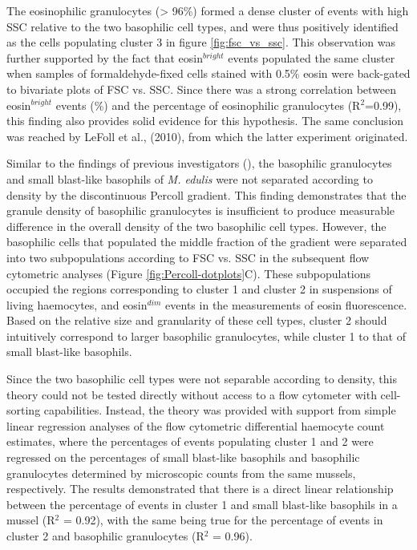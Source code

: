 The eosinophilic granulocytes (> 96\%) formed a dense cluster of events with high SSC relative to the two basophilic cell types, and were thus positively identified as the cells populating cluster 3 in figure \ref{fig:fsc_vs_ssc}. This observation was further supported by the fact that eosin$^{bright}$ events populated the same cluster when samples of formaldehyde-fixed cells stained with 0.5\% eosin were back-gated to bivariate plots of FSC vs. SSC. Since there was a strong correlation between eosin$^{bright}$ events (\%) and the percentage of eosinophilic granulocytes (R$^{2}$=0.99), this finding also provides solid evidence for this hypothesis. The same conclusion was reached by LeFoll et al., (2010), from which the latter experiment originated.

Similar to the findings of previous investigators (\cite{Friebel1995, Pipe1997, Carballal1997}), the basophilic granulocytes and small blast-like basophils of \emph{M. edulis} were not separated according to density by the discontinuous Percoll gradient. This finding demonstrates that the granule density of basophilic granulocytes is insufficient to produce measurable difference in the overall density of the two basophilic cell types. However, the basophilic cells that populated the middle fraction of the gradient were separated into two subpopulations according to FSC vs. SSC in the subsequent flow cytometric analyses (Figure \ref{fig:Percoll-dotplots}C). These subpopulations occupied the regions corresponding to cluster 1 and cluster 2 in suspensions of living haemocytes, and eosin$^{dim}$ events in the measurements of eosin fluorescence. Based on the relative size and granularity of these cell types, cluster 2 should intuitively correspond to larger basophilic granulocytes, while cluster 1 to that of small blast-like basophils.

Since the two basophilic cell types were not separable according to density, this theory could not be tested directly without access to a flow cytometer with cell-sorting capabilities. Instead, the theory was provided with support from simple linear regression analyses of the flow cytometric differential haemocyte count estimates, where the percentages of events populating cluster 1 and 2 were regressed on the percentages of small blast-like basophils and basophilic granulocytes determined by microscopic counts from the same mussels, respectively. The results demonstrated that there is a direct linear relationship between the percentage of events in cluster 1 and small blast-like basophils in a mussel (R$^{2}$ = 0.92), with the same being true for the percentage of events in cluster 2 and basophilic granulocytes (R$^{2}$ = 0.96).

